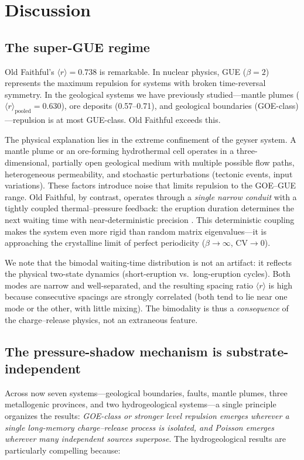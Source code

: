 \documentclass[12pt,a4paper]{article}
\begin{document}
\section{Discussion}

\subsection{The super-GUE regime}

Old Faithful's $\langle r\rangle=0.738$ is remarkable. In nuclear physics, GUE ($\beta=2$) represents the maximum repulsion for systems with broken time-reversal symmetry. In the geological systems we have previously studied---mantle plumes ($\langle r\rangle_\mathrm{pooled}=0.630$), ore deposits (0.57--0.71), and geological boundaries (GOE-class)---repulsion is at most GUE-class. Old Faithful exceeds this.

The physical explanation lies in the extreme confinement of the geyser system. A mantle plume or an ore-forming hydrothermal cell operates in a three-dimensional, partially open geological medium with multiple possible flow paths, heterogeneous permeability, and stochastic perturbations (tectonic events, input variations). These factors introduce noise that limits repulsion to the GOE--GUE range. Old Faithful, by contrast, operates through a \emph{single narrow conduit} with a tightly coupled thermal--pressure feedback: the eruption duration determines the next waiting time with near-deterministic precision \citep{hurwitz2014}. This deterministic coupling makes the system even more rigid than random matrix eigenvalues---it is approaching the crystalline limit of perfect periodicity ($\beta\to\infty$, $\mathrm{CV}\to0$).

We note that the bimodal waiting-time distribution is not an artifact: it reflects the physical two-state dynamics (short-eruption vs.\ long-eruption cycles). Both modes are narrow and well-separated, and the resulting spacing ratio $\langle r\rangle$ is high because consecutive spacings are strongly correlated (both tend to lie near one mode or the other, with little mixing). The bimodality is thus a \emph{consequence} of the charge--release physics, not an extraneous feature.

\subsection{The pressure-shadow mechanism is substrate-independent}

Across now seven systems---geological boundaries, faults, mantle plumes, three metallogenic provinces, and two hydrogeological systems---a single principle organizes the results: \emph{GOE-class or stronger level repulsion emerges wherever a single long-memory charge--release process is isolated, and Poisson emerges wherever many independent sources superpose}. The hydrogeological results are particularly compelling because:
\end{document}
